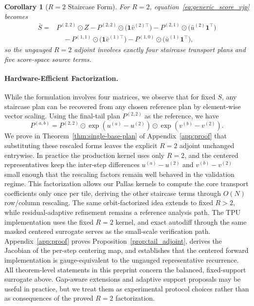 \documentclass{article}
\newtheorem{corollary}{Corollary}
\begin{document}
\begin{corollary}[$R=2$ Staircase Form]\label{cor:r2_staircase}
For $R=2$, equation~\eqref{eq:generic_score_vjp} becomes
\begin{align}
    \bar S
    ={}&
    P^{(2,2)} \odot Z
    - P^{(2,2)} \odot \bigl(\mathbf{1}\bar v^{(2)\top}\bigr)
    - P^{(2,1)} \odot \bigl(\bar u^{(2)}\mathbf{1}^\top\bigr) \nonumber\\
    &\quad
    - P^{(1,1)} \odot \bigl(\mathbf{1}\bar v^{(1)\top}\bigr)
    - P^{(1,0)} \odot \bigl(\bar u^{(1)}\mathbf{1}^\top\bigr),
\end{align}
so the ungauged $R=2$ adjoint involves exactly four staircase transport plans and five score-space source terms.
\end{corollary}

\paragraph{Hardware-Efficient Factorization.} While the formulation involves four matrices, we observe that for fixed $S$, any staircase plan can be recovered from any chosen reference plan by element-wise vector scaling. Using the final-tail plan $P^{(2,2)}$ as the reference, we have
\begin{equation}
    P^{(a,b)} = P^{(2,2)} \odot \exp(u^{(a)} - u^{(2)}) \odot \exp(v^{(b)} - v^{(2)}).
\end{equation}
We prove in Theorem~\ref{thm:single-base-plan} of Appendix~\ref{app:proof} that substituting these rescaled forms leaves the explicit $R=2$ adjoint unchanged entrywise. In practice the production kernel uses only $R=2$, and the centered representatives keep the inter-step differences $u^{(a)}-u^{(2)}$ and $v^{(b)}-v^{(2)}$ small enough that the rescaling factors remain well behaved in the validation regime. This factorization allows our Pallas kernels to compute the core transport coefficients only once per tile, deriving the other staircase terms through $O(N)$ row/column rescaling. The same orbit-factorized idea extends to fixed $R>2$, while residual-adaptive refinement remains a reference analysis path. The TPU implementation uses the fixed $R=2$ kernel, and exact autodiff through the same masked centered surrogate serves as the small-scale verification path. Appendix~\ref{app:proof} proves Proposition~\ref{prop:tail_adjoint}, derives the Jacobian of the per-step centering map, and establishes that the centered forward implementation is gauge-equivalent to the ungauged representative recurrence.
All theorem-level statements in this preprint concern the balanced, fixed-support surrogate above. Gap-aware extensions and adaptive support proposals may be useful in practice, but we treat them as experimental protocol choices rather than as consequences of the proved $R=2$ factorization.
\end{document}
